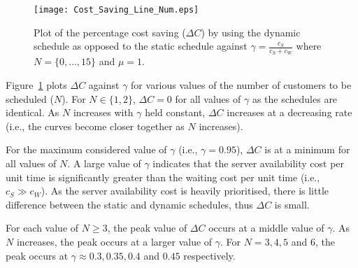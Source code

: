 \begin{figure}[htb]
	\centering
	\texttt{[image: Cost\_Saving\_Line\_Num.eps]}
	\caption{Plot of the percentage cost saving ($\Delta C$) by using the dynamic schedule as opposed to the static schedule against $\gamma = \frac{c_{S}}{c_{S} + c_{W}}$ where $N = \{ 0, \ldots, 15 \}$ and $\mu = 1$.}
	\label{Graph_Cost_Saving}
\end{figure}

Figure~\ref{Graph_Cost_Saving} plots $\Delta C$ against $\gamma$ for various values of the number of customers to be scheduled ($N$). For $N \in \{ 1, 2 \}$, $\Delta C = 0$ for all values of $\gamma$ as the schedules are identical. As $N$ increases with $\gamma$ held constant, $\Delta C$ increases at a decreasing rate (i.e., the curves become closer together as $N$ increases).

For the maximum considered value of $\gamma$ (i.e., $\gamma = 0.95$), $\Delta C$ is at a minimum for all values of $N$. A large value of $\gamma$ indicates that the server availability cost per unit time is significantly greater than the waiting cost per unit time (i.e., $c_{S} \gg c_{W}$). As the server availability cost is heavily prioritised, there is little difference between the static and dynamic schedules, thus $\Delta C$ is small.

For each value of $N \geq 3$, the peak value of $\Delta C$ occurs at a middle value of $\gamma$. As $N$ increases, the peak occurs at a larger value of $\gamma$. For $N = 3, 4, 5$ and $6$, the peak occurs at $\gamma \approx 0.3, 0.35, 0.4$ and $0.45$ respectively.